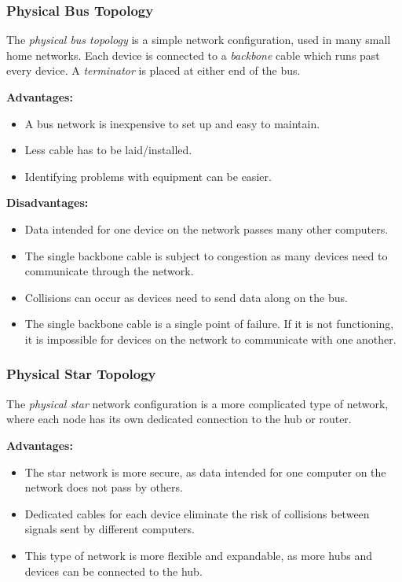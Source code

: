 \documentclass[9pt]{article}
\begin{document}
\subsubsection{Physical Bus Topology}
\label{sec:org238572b}

The \emph{physical bus topology} is a simple network configuration, used in many small home networks. Each device is connected to a \emph{backbone} cable which runs past every device. A \emph{terminator} is placed at either end of the bus.

\textbf{Advantages:}

\begin{itemize}
\item A bus network is inexpensive to set up and easy to maintain.
\item Less cable has to be laid/installed.
\item Identifying problems with equipment can be easier.
\end{itemize}

\textbf{Disadvantages:}

\begin{itemize}
\item Data intended for one device on the network passes many other computers.
\item The single backbone cable is subject to congestion as many devices need to communicate through the network.
\item Collisions can occur as devices need to send data along on the bus.
\item The single backbone cable is a single point of failure. If it is not functioning, it is impossible for devices on the network to communicate with one another.
\end{itemize}

\subsubsection{Physical Star Topology}
\label{sec:org911dd44}

The \emph{physical star} network configuration is a more complicated type of network, where each node has its own dedicated connection to the hub or router.

\textbf{Advantages:}

\begin{itemize}
\item The star network is more secure, as data intended for one computer on the network does not pass by others.
\item Dedicated cables for each device eliminate the risk of collisions between signals sent by different computers.
\item This type of network is more flexible and expandable, as more hubs and devices can be connected to the hub.
\end{itemize}
\end{document}
